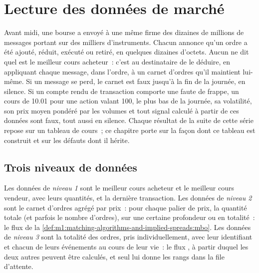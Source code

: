 \chapter{Lecture des données de marché}\label{ch:m1:reading-market-data}

Avant midi, une bourse a envoyé à une même firme des dizaines de millions de messages portant sur
des milliers d'instruments. Chacun annonce qu'un ordre a été ajouté, réduit,
exécuté ou retiré, en quelques dizaines d'octets. Aucun ne dit quel est le meilleur cours acheteur~:
c'est au destinataire de le déduire, en appliquant chaque message, dans l'ordre, à
un carnet d'ordres qu'il maintient lui-même. Si un message se perd, le carnet est faux
jusqu'à la fin de la journée, en silence. Si un compte rendu de transaction comporte une faute de frappe, un cours
de 10.01 pour une action valant 100, le plus bas de la journée, sa volatilité, son
prix moyen pondéré par les volumes et tout signal calculé à partir de ces données sont faux,
tout aussi en silence. Chaque résultat de la suite de cette série repose sur un tableau de
cours~; ce chapitre porte sur la façon dont ce tableau est construit et sur les défauts
dont il hérite.

\section{Trois niveaux de données}

\begin{definition}\label{def:m1:reading-market-data:levels}
Les données de \emph{niveau 1} sont le meilleur cours acheteur et le meilleur cours vendeur, avec leurs
quantités, et la dernière transaction. Les données de \emph{niveau 2} sont le carnet
d'ordres agrégé par prix~: pour chaque palier de prix, la quantité totale (et parfois
le nombre d'ordres), sur une certaine profondeur ou en totalité~: le flux  de
la \cref{def:m1:matching-algorithms-and-implied-spreads:mbo}. Les données de \emph{niveau
3} sont la totalité des ordres, pris individuellement, avec leur identifiant et
chacun de leurs événements au cours de leur vie~: le flux , à partir duquel les deux autres
peuvent être calculés, et seul lui donne les rangs dans la file d'attente.
\end{definition}

